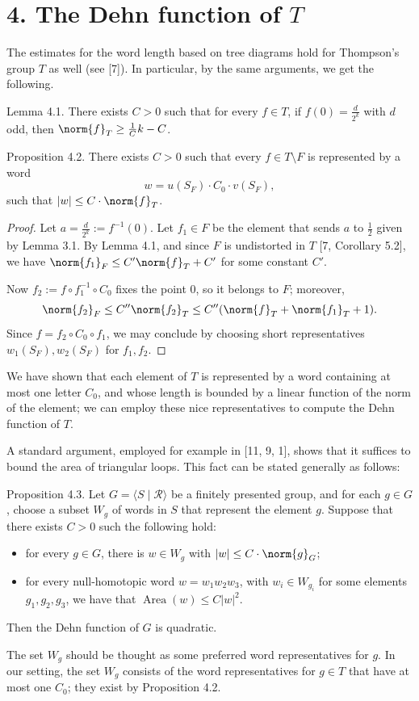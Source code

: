 \section*{4. The Dehn function of $T$}
The estimates for the word length based on tree diagrams hold for Thompson's group $T$ as well (see [7]). In particular, by the same arguments, we get the following.

\begin{authorstatement}{Lemma 4.1.}
There exists $C>0$ such that for every $f\in T$, if $f(0)=\frac d{2^k}$ with $d$ odd, then $\norm{f}_T\ge\frac1Ck-C$.
\end{authorstatement}
\begin{authorstatement}{Proposition 4.2.}
There exists $C>0$ such that every $f\in T\setminus F$ is represented by a word
\[
w=u(S_F)\cdot C_0\cdot v(S_F),
\]
such that $|w|\le C\cdot\norm{f}_T$.
\end{authorstatement}
\begin{proof}
Let $a=\frac d{2^k}:=f^{-1}(0)$. Let $f_1\in F$ be the element that sends $a$ to $\frac12$ given by Lemma 3.1. By Lemma 4.1, and since $F$ is undistorted in $T$ [7, Corollary 5.2], we have $\norm{f_1}_F\le C'\norm{f}_T+C'$ for some constant $C'$.

Now $f_2:=f\circ f_1^{-1}\circ C_0$ fixes the point $0$, so it belongs to $F$; moreover,
\[
\norm{f_2}_F\le C''\norm{f_2}_T\le C''(\norm{f}_T+\norm{f_1}_T+1).
\]
Since $f=f_2\circ C_0\circ f_1$, we may conclude by choosing short representatives $w_1(S_F),w_2(S_F)$ for $f_1,f_2$.
\end{proof}
We have shown that each element of $T$ is represented by a word containing at most one letter $C_0$, and whose length is bounded by a linear function of the norm of the element; we can employ these nice representatives to compute the Dehn function of $T$.

A standard argument, employed for example in [11, 9, 1], shows that it suffices to bound the area of triangular loops. This fact can be stated generally as follows:
\begin{authorstatement}{Proposition 4.3.}
Let $G=\langle S\mid\mathcal{R}\rangle$ be a finitely presented group, and for each $g\in G$, choose a subset $W_g$ of words in $S$ that represent the element $g$. Suppose that there exists $C>0$ such the following hold:
\begin{itemize}
\item[$\circ$] for every $g\in G$, there is $w\in W_g$ with $|w|\le C\cdot\norm{g}_G$;
\item[$\circ$] for every null-homotopic word $w=w_1w_2w_3$, with $w_i\in W_{g_i}$ for some elements $g_1,g_2,g_3$, we have that $\operatorname{Area}(w)\le C|w|^2$.
\end{itemize}
Then the Dehn function of $G$ is quadratic.
\end{authorstatement}
The set $W_g$ should be thought as some preferred word representatives for $g$. In our setting, the set $W_g$ consists of the word representatives for $g\in T$ that have at most one $C_0$; they exist by Proposition 4.2.

